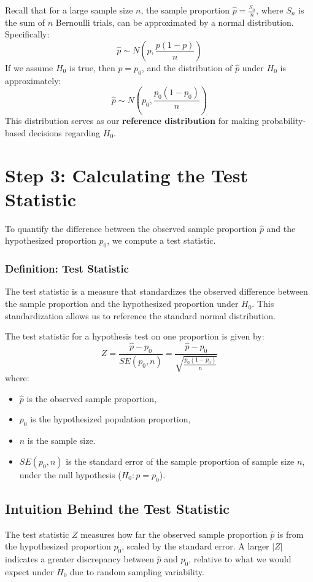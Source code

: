 \documentclass[11pt]{article}
\begin{document}
Recall that for a large sample size \( n \), the sample proportion \( \hat{p} = \frac{S_n}{n} \), where \( S_n \) is the sum of \( n \) Bernoulli trials, can be approximated by a normal distribution. Specifically:
\[
\hat{p} \sim N\left(p, \frac{p(1-p)}{n}\right)
\]
If we assume \( H_0 \) is true, then \( p = p_0 \), and the distribution of \( \hat{p} \) under \( H_0 \) is approximately:
\[
\hat{p} \sim N\left(p_0, \frac{p_0(1-p_0)}{n}\right)
\]
This distribution serves as our \textbf{reference distribution} for making probability-based decisions regarding \( H_0 \).

\section*{Step 3: Calculating the Test Statistic}

To quantify the difference between the observed sample proportion \( \hat{p} \) and the hypothesized proportion \( p_0 \), we compute a test statistic. 

\subsubsection*{Definition: Test Statistic}
The test statistic is a measure that standardizes the observed difference between the sample proportion and the hypothesized proportion under \( H_0 \). This standardization allows us to reference the standard normal distribution.

The test statistic for a hypothesis test on one proportion is given by:
\[
Z = \frac{\hat{p} - p_0}{SE(p_0, n)} = \frac{\hat{p} - p_0}{\sqrt{\frac{p_0(1-p_0)}{n}}}
\]
where:
\begin{itemize}
    \item \( \hat{p} \) is the observed sample proportion,
    \item \( p_0 \) is the hypothesized population proportion,
    \item \( n \) is the sample size.
    \item $SE(p_0, n)$ is the standard error of the sample proportion of sample size $n$, under the null hypothesis ($H_0: p=p_0$).
\end{itemize}


\subsection*{Intuition Behind the Test Statistic}

The test statistic \( Z \) measures how far the observed sample proportion \( \hat{p} \) is from the hypothesized proportion \( p_0 \), scaled by the standard error. A larger \( |Z| \) indicates a greater discrepancy between \( \hat{p} \) and \( p_0 \), relative to what we would expect under \( H_0 \) due to random sampling variability.
\end{document}
